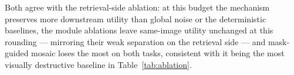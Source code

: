 \documentclass[10pt,journal]{IEEEtran}
\begin{document}

Both agree with the retrieval-side ablation: at this budget the mechanism
preserves more downstream utility than global noise or the deterministic
baselines, the module ablations leave same-image utility unchanged at this
rounding --- mirroring their weak separation on the retrieval side --- and
mask-guided mosaic loses the most on both tasks, consistent with it being the
most visually destructive baseline in Table~\ref{tab:ablation}.

\end{document}
